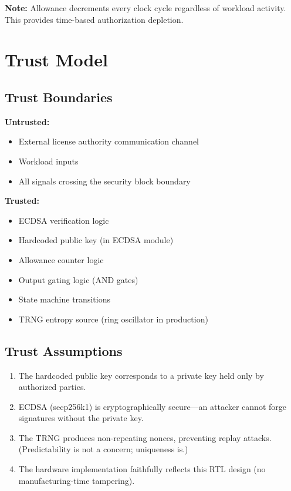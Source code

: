 \documentclass[11pt]{article}
\begin{document}
\textbf{Note:} Allowance decrements every clock cycle regardless of workload activity. This provides time-based authorization depletion.

\section{Trust Model}

\subsection{Trust Boundaries}

\textbf{Untrusted:}
\begin{itemize}
    \item External license authority communication channel
    \item Workload inputs
    \item All signals crossing the security block boundary
\end{itemize}

\textbf{Trusted:}
\begin{itemize}
    \item ECDSA verification logic
    \item Hardcoded public key (in ECDSA module)
    \item Allowance counter logic
    \item Output gating logic (AND gates)
    \item State machine transitions
    \item TRNG entropy source (ring oscillator in production)
\end{itemize}

\subsection{Trust Assumptions}

\begin{enumerate}
    \item The hardcoded public key corresponds to a private key held only by authorized parties.
    \item ECDSA (secp256k1) is cryptographically secure---an attacker cannot forge signatures without the private key.
    \item The TRNG produces non-repeating nonces, preventing replay attacks. (Predictability is not a concern; uniqueness is.)
    \item The hardware implementation faithfully reflects this RTL design (no manufacturing-time tampering).
\end{enumerate}
\end{document}
